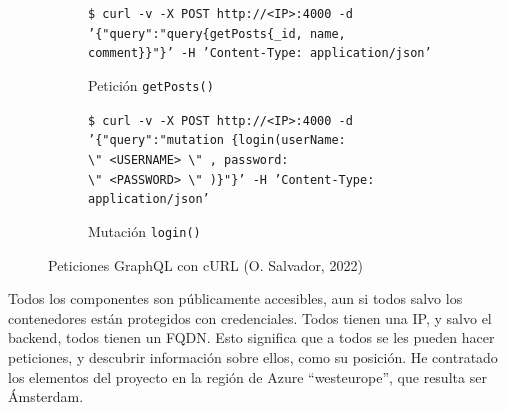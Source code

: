 \documentclass[11pt]{article}
\begin{document}
\begin{flushleft}
		\begin{figure}[htb]
			\centering
			\begin{subfigure}{\textwidth}
				\footnotesize
				\texttt{\$ curl -v -X POST http://<IP>:4000 -d '\{"query":"query\{getPosts\{\_id, name, comment\}\}"\}' -H 'Content-Type: application/json'} 
				\caption{Petición \texttt{getPosts()}}
			\end{subfigure}
			\linebreak
			
			\begin{subfigure}{\textwidth}
				\begin{subfigure}{\textwidth}
				\centering
				\end{subfigure}
				\linebreak
				\footnotesize
				\texttt{\$ curl -v -X POST http://<IP>:4000 -d '\{"query":"mutation \{login(userName: \textbackslash"\ <USERNAME>\ \textbackslash"\ , password: \textbackslash"\ <PASSWORD>\ \textbackslash "\ )\}"\}' -H 'Content-Type: application/json'} 
				\caption{Mutación \texttt{login()}}
			\end{subfigure}
			\linebreak
			
			\caption{Peticiones GraphQL con cURL (O. Salvador, 2022)}
		\end{figure}
	
	\clearpage
	Todos los componentes son públicamente accesibles, aun si todos salvo los contenedores están protegidos con credenciales. Todos tienen una IP, y salvo el backend, todos tienen un FQDN. Esto significa que a todos se les pueden hacer peticiones, y descubrir información sobre ellos, como su posición. He contratado los elementos del proyecto en la región de Azure ``westeurope'', que resulta ser Ámsterdam.
	

\end{flushleft}
\end{document}
